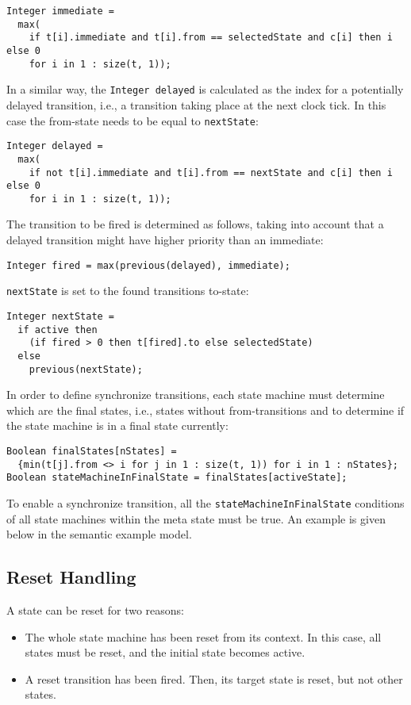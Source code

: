 \begin{lstlisting}[language=modelica]
Integer immediate =
  max(
    if t[i].immediate and t[i].from == selectedState and c[i] then i else 0
    for i in 1 : size(t, 1));
\end{lstlisting}

In a similar way, the \lstinline!Integer delayed! is calculated as the index for a potentially delayed transition, i.e., a transition taking place at the next clock tick.
In this case the from-state needs to be equal to \lstinline!nextState!:
\begin{lstlisting}[language=modelica]
Integer delayed =
  max(
    if not t[i].immediate and t[i].from == nextState and c[i] then i else 0
    for i in 1 : size(t, 1));
\end{lstlisting}

The transition to be fired is determined as follows, taking into account that a delayed transition might have higher priority than an immediate:
\begin{lstlisting}[language=modelica]
Integer fired = max(previous(delayed), immediate);
\end{lstlisting}
\lstinline!nextState! is set to the found transitions to-state:
\begin{lstlisting}[language=modelica]
Integer nextState =
  if active then
    (if fired > 0 then t[fired].to else selectedState)
  else
    previous(nextState);
\end{lstlisting}
In order to define synchronize transitions, each state machine must determine which are the final states, i.e., states without from-transitions and to determine if the state machine is in a final state currently:
\begin{lstlisting}[language=modelica]
Boolean finalStates[nStates] =
  {min(t[j].from <> i for j in 1 : size(t, 1)) for i in 1 : nStates};
Boolean stateMachineInFinalState = finalStates[activeState];
\end{lstlisting}
To enable a synchronize transition, all the \lstinline!stateMachineInFinalState! conditions of all state machines within the meta state must be true.
An example is given below in the semantic example model.

\subsection{Reset Handling}\label{reset-handling}

A state can be reset for two reasons:
\begin{itemize}
\item
  The whole state machine has been reset from its context.
  In this case, all states must be reset, and the initial state becomes active.
\item
  A reset transition has been fired.
  Then, its target state is reset, but not other states.
\end{itemize}

